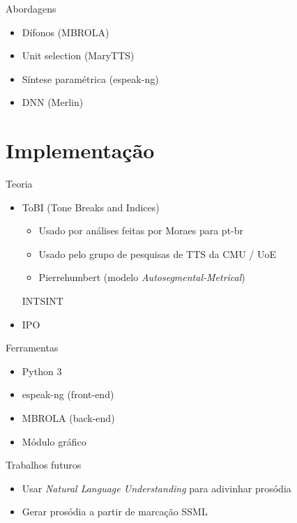 \documentclass{beamer}
\begin{document}
\begin{frame}{Abordagens}
  \begin{itemize}
    \item Dífonos (MBROLA)
    \item Unit selection (MaryTTS)
    \item Síntese paramétrica (espeak-ng)
    \item DNN (Merlin)
  \end{itemize}
\end{frame}

\section{Implementação}
\begin{frame}{Teoria}
  \begin{itemize}
  \item ToBI (Tone Breaks and Indices)
    \begin{itemize}
    \item Usado por análises feitas por Moraes para pt-br
    \item Usado pelo grupo de pesquisas de TTS da CMU / UoE
    \item Pierrehumbert (modelo \emph{Autosegmental-Metrical})
    \end{itemize}
  \icem INTSINT
  \item IPO
  \end{itemize}
\end{frame}

\begin{frame}{Ferramentas}
  \begin{itemize}
    \item Python 3
    \item espeak-ng (front-end)
    \item MBROLA (back-end)
    \item Módulo gráfico
  \end{itemize}
\end{frame}

\begin{frame}{Trabalhos futuros}
  \begin{itemize}
    \item Usar \emph{Natural Language Understanding} para adivinhar prosódia
    \item Gerar prosódia a partir de marcação SSML
  \end{itemize}
\end{frame}
\end{document}
